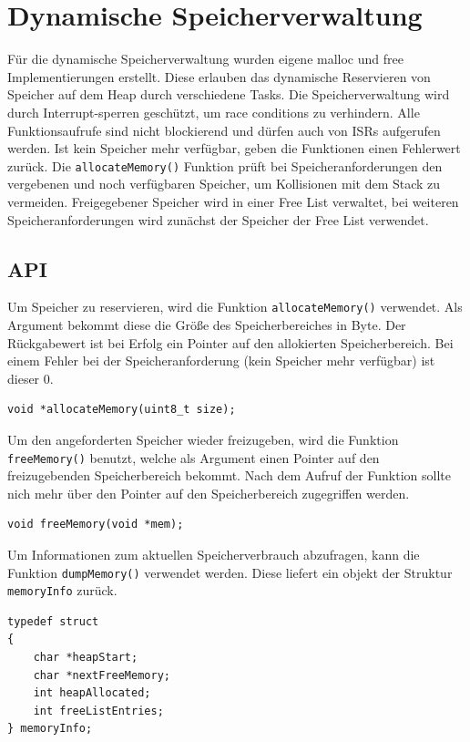 \documentclass[fontsize=12pt, toc=bibliography, notitlepage]{scrreprt}
\begin{document}
\chapter{Dynamische Speicherverwaltung}
\label{chap:dynamische-speicherverwaltung}
Für die dynamische Speicherverwaltung wurden eigene malloc und free Implementierungen erstellt. Diese erlauben das dynamische Reservieren von Speicher auf dem Heap durch verschiedene Tasks. Die Speicherverwaltung wird durch Interrupt-sperren geschützt, um race conditions zu verhindern. Alle Funktionsaufrufe sind nicht blockierend und dürfen auch von ISRs aufgerufen werden. Ist kein Speicher mehr verfügbar, geben die Funktionen einen Fehlerwert zurück. Die \lstinline$allocateMemory()$ Funktion prüft bei Speicheranforderungen den vergebenen und noch verfügbaren Speicher, um Kollisionen mit dem Stack zu vermeiden. Freigegebener Speicher wird in einer Free List verwaltet, bei weiteren Speicheranforderungen wird zunächst der Speicher der Free List verwendet.

\section{API}
\label{subsec:mem-api}
Um Speicher zu reservieren, wird die Funktion \lstinline$allocateMemory()$ verwendet. Als Argument bekommt diese die Größe des Speicherbereiches in Byte. Der Rückgabewert ist bei Erfolg ein Pointer auf den allokierten Speicherbereich. Bei einem Fehler bei der Speicheranforderung (kein Speicher mehr verfügbar) ist dieser 0.

\begin{lstlisting}[title=memory.h]
void *allocateMemory(uint8_t size);
\end{lstlisting}

Um den angeforderten Speicher wieder freizugeben, wird die Funktion \lstinline$freeMemory()$ benutzt, welche als Argument einen Pointer auf den freizugebenden  Speicherbereich bekommt. Nach dem Aufruf der Funktion sollte nich mehr über den Pointer auf den Speicherbereich zugegriffen werden.

\begin{lstlisting}[title=memory.h]
void freeMemory(void *mem);
\end{lstlisting}

Um Informationen zum aktuellen Speicherverbrauch abzufragen, kann die Funktion \lstinline$dumpMemory()$ verwendet werden. Diese liefert ein objekt der Struktur \lstinline$memoryInfo$ zurück.

\begin{lstlisting}[title=memory.h]
typedef struct
{
	char *heapStart;
	char *nextFreeMemory;
	int heapAllocated;
	int freeListEntries;
} memoryInfo;
\end{lstlisting}
\end{document}

